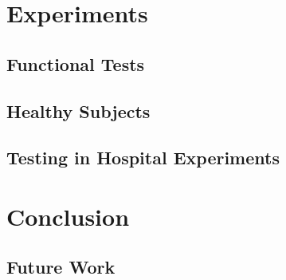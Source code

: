 \documentclass{article}
\begin{document}
\section{Experiments}
	\subsection{Functional Tests}
	\subsection{Healthy Subjects}
	\subsection{Testing in Hospital Experiments} 
	
\section{Conclusion}
	\subsection{Future Work}



\end{document}
